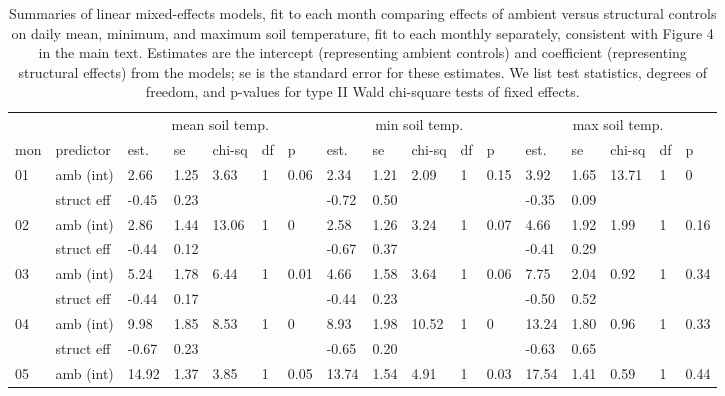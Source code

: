 \documentclass{article}
\begin{document}
\begin{table}[ht]
\centering
\caption{Summaries of linear mixed-effects models, fit to each month comparing effects of ambient versus structural controls on daily mean, minimum, and maximum soil temperature, fit to each monthly separately, consistent with Figure 4 in the main text. Estimates are the intercept (representing ambient controls) and coefficient (representing structural effects) from the models; se is the standard error for these estimates. We list test statistics, degrees of freedom, and p-values for type II Wald chi-square tests of fixed effects.} 
\label{table:shamamb_stempm}
\begin{tabular}{|p{}|p{}|p{}p{}p{}p{}p{}|p{}p{}p{}p{}p{}|p{}p{}p{}p{}p{}|}
  \hline
  & &\multicolumn{5}{c}{mean soil temp.} &\multicolumn{5}{c}{min soil temp.} &\multicolumn{5}{c}{max soil temp.}\\
 mon & predictor & est. & se & chi-sq & df & p & est. & se & chi-sq & df & p & est. & se & chi-sq & df & p\\
 \hline
01 & amb (int) & 2.66 & 1.25 & 3.63 & 1 & 0.06 & 2.34 & 1.21 & 2.09 & 1 & 0.15 & 3.92 & 1.65 & 13.71 & 1 & 0 \\ 
    & struct eff & -0.45 & 0.23 &  &  &  & -0.72 & 0.50 &  &  &  & -0.35 & 0.09 &  &  &  \\ 
   \hline
02 & amb (int) & 2.86 & 1.44 & 13.06 & 1 & 0 & 2.58 & 1.26 & 3.24 & 1 & 0.07 & 4.66 & 1.92 & 1.99 & 1 & 0.16 \\ 
    & struct eff & -0.44 & 0.12 &  &  &  & -0.67 & 0.37 &  &  &  & -0.41 & 0.29 &  &  &  \\ 
   \hline
03 & amb (int) & 5.24 & 1.78 & 6.44 & 1 & 0.01 & 4.66 & 1.58 & 3.64 & 1 & 0.06 & 7.75 & 2.04 & 0.92 & 1 & 0.34 \\ 
    & struct eff & -0.44 & 0.17 &  &  &  & -0.44 & 0.23 &  &  &  & -0.50 & 0.52 &  &  &  \\ 
   \hline
04 & amb (int) & 9.98 & 1.85 & 8.53 & 1 & 0 & 8.93 & 1.98 & 10.52 & 1 & 0 & 13.24 & 1.80 & 0.96 & 1 & 0.33 \\ 
    & struct eff & -0.67 & 0.23 &  &  &  & -0.65 & 0.20 &  &  &  & -0.63 & 0.65 &  &  &  \\ 
   \hline
05 & amb (int) & 14.92 & 1.37 & 3.85 & 1 & 0.05 & 13.74 & 1.54 & 4.91 & 1 & 0.03 & 17.54 & 1.41 & 0.59 & 1 & 0.44 \\ 

\end{tabular}
\end{table}
\end{document}
